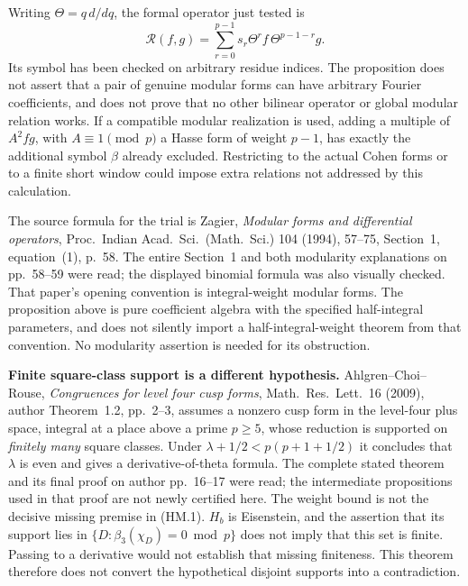 \documentclass[11pt,a4paper]{article}
\theoremstyle{definition}
\renewcommand{\paragraph}[1]{\par\smallskip\noindent\textbf{#1}\quad\ignorespaces}
\begin{document}
Writing $\Theta=q\,d/dq$, the formal operator just tested is
\[
 \mathcal R(f,g)=\sum_{r=0}^{p-1}s_r
          \Theta^rf\,\Theta^{p-1-r}g.
 \tag{HM.8}
\]
Its symbol has been checked on arbitrary residue indices.  The proposition
does not assert that a pair of genuine modular forms can have arbitrary
Fourier coefficients, and does not prove that no other bilinear operator
or global modular relation works.  If a compatible modular realization
is used, adding a multiple of $A^2fg$, with $A\equiv1\pmod p$ a Hasse
form of weight $p-1$, has exactly the additional symbol $\beta$ already
excluded.  Restricting to the actual Cohen forms or to a finite short
window could impose extra relations not addressed by this calculation.

The source formula for the trial is Zagier, \emph{Modular forms and
differential operators}, Proc.\ Indian Acad.\ Sci.\ (Math.\ Sci.)
104 (1994), 57--75, Section~1, equation~(1), p.~58.  The entire Section~1
and both modularity explanations on pp.~58--59 were read; the displayed
binomial formula was also visually checked.  That paper's opening
convention is integral-weight modular forms.  The proposition above is
pure coefficient algebra with the specified half-integral parameters,
and does not silently import a half-integral-weight theorem from that
convention.  No modularity assertion is needed for its obstruction.

\paragraph{Finite square-class support is a different hypothesis.}
Ahlgren--Choi--Rouse, \emph{Congruences for level four cusp forms},
Math.\ Res.\ Lett.\ 16 (2009), author Theorem~1.2, pp.~2--3, assumes a
nonzero cusp form in the level-four plus space, integral at a place
above a prime $p\ge5$, whose reduction is supported on \emph{finitely
many} square classes.  Under
$\lambda+1/2<p(p+1+1/2)$ it concludes that $\lambda$ is even and gives
a derivative-of-theta formula.  The complete stated theorem and its
final proof on author pp.~16--17 were read; the intermediate
propositions used in that proof are not newly certified here.
The weight bound is not the decisive missing premise in (HM.1).
$H_b$ is Eisenstein, and the assertion that its support lies in
$\{D:\beta_3(\chi_D)=0\bmod p\}$ does not imply that this set is finite.
Passing to a derivative would not establish that missing finiteness.
This theorem therefore does not convert the hypothetical disjoint
supports into a contradiction.
\end{document}
